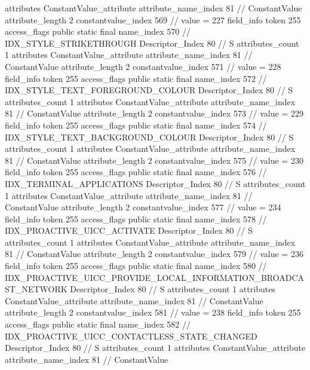 {{{{{				attributes {
				ConstantValue_attribute {
					attribute_name_index	81		// ConstantValue
					attribute_length	2
					constantvalue_index	569		// value = 227
				}
				}
			}
			field_info {
				token	255
				access_flags	public static final
				name_index	570		// IDX_STYLE_STRIKETHROUGH
				Descriptor_Index	80		// S
				attributes_count	1
				attributes {
				ConstantValue_attribute {
					attribute_name_index	81		// ConstantValue
					attribute_length	2
					constantvalue_index	571		// value = 228
				}
				}
			}
			field_info {
				token	255
				access_flags	public static final
				name_index	572		// IDX_STYLE_TEXT_FOREGROUND_COLOUR
				Descriptor_Index	80		// S
				attributes_count	1
				attributes {
				ConstantValue_attribute {
					attribute_name_index	81		// ConstantValue
					attribute_length	2
					constantvalue_index	573		// value = 229
				}
				}
			}
			field_info {
				token	255
				access_flags	public static final
				name_index	574		// IDX_STYLE_TEXT_BACKGROUND_COLOUR
				Descriptor_Index	80		// S
				attributes_count	1
				attributes {
				ConstantValue_attribute {
					attribute_name_index	81		// ConstantValue
					attribute_length	2
					constantvalue_index	575		// value = 230
				}
				}
			}
			field_info {
				token	255
				access_flags	public static final
				name_index	576		// IDX_TERMINAL_APPLICATIONS
				Descriptor_Index	80		// S
				attributes_count	1
				attributes {
				ConstantValue_attribute {
					attribute_name_index	81		// ConstantValue
					attribute_length	2
					constantvalue_index	577		// value = 234
				}
				}
			}
			field_info {
				token	255
				access_flags	public static final
				name_index	578		// IDX_PROACTIVE_UICC_ACTIVATE
				Descriptor_Index	80		// S
				attributes_count	1
				attributes {
				ConstantValue_attribute {
					attribute_name_index	81		// ConstantValue
					attribute_length	2
					constantvalue_index	579		// value = 236
				}
				}
			}
			field_info {
				token	255
				access_flags	public static final
				name_index	580		// IDX_PROACTIVE_UICC_PROVIDE_LOCAL_INFORMATION_BROADCAST_NETWORK
				Descriptor_Index	80		// S
				attributes_count	1
				attributes {
				ConstantValue_attribute {
					attribute_name_index	81		// ConstantValue
					attribute_length	2
					constantvalue_index	581		// value = 238
				}
				}
			}
			field_info {
				token	255
				access_flags	public static final
				name_index	582		// IDX_PROACTIVE_UICC_CONTACTLESS_STATE_CHANGED
				Descriptor_Index	80		// S
				attributes_count	1
				attributes {
				ConstantValue_attribute {
					attribute_name_index	81		// ConstantValue
}}}}}}}
